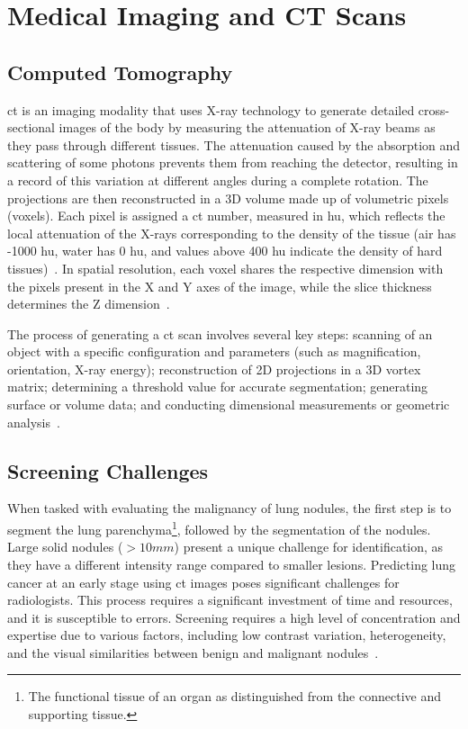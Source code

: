 \section{Medical Imaging and CT Scans}\label{sec:med_image}

\subsection{Computed Tomography}\label{subsec:ct}

\acf{ct} is an imaging modality that uses X-ray technology to generate detailed cross-sectional images of the body by measuring the attenuation of X-ray beams as they pass through different tissues.
The attenuation caused by the absorption and scattering of some photons prevents them from reaching the detector, resulting in a record of this variation at different angles during a complete rotation.
The projections are then reconstructed in a 3D volume made up of volumetric pixels (voxels). Each pixel is assigned a \ac{ct} number, measured in \ac{hu}, which reflects the local attenuation of the X-rays corresponding to the density of the tissue (air has -1000 \ac{hu}, water has 0 \ac{hu}, and values above 400 \ac{hu} indicate the density of hard tissues)~\cite{rodrigues_efficient-proto-caps_2025}. In spatial resolution, each voxel shares the respective dimension with the pixels present in the X and Y axes of the image, while the slice thickness determines the Z dimension~\cite{cantatore_introduction_2011, buzug_computed_2011, mazonakis_computed_2016}.

The process of generating a \ac{ct} scan involves several key steps: scanning of an object with a specific configuration and parameters (such as magnification, orientation, X-ray energy); reconstruction of 2D projections in a 3D vortex matrix; determining a threshold value for accurate segmentation; generating surface or volume data; and conducting dimensional measurements or geometric analysis~\cite{cantatore_introduction_2011}.

\subsection{Screening Challenges}

When tasked with evaluating the malignancy of lung nodules, the first step is to segment the lung parenchyma\footnote{The functional tissue of an organ as distinguished from the connective and supporting tissue.
}, followed by the segmentation of the nodules. Large solid nodules ($> 10 mm$) present a unique challenge for identification, as they have a different intensity range compared to smaller lesions.
Predicting lung cancer at an early stage using \ac{ct} images poses significant challenges for radiologists. This process requires a significant investment of time and resources, and it is susceptible to errors. Screening requires a high level of concentration and expertise due to various factors, including low contrast variation, heterogeneity, and the visual similarities between benign and malignant nodules~\cite{jassim_systematic_2022}.

